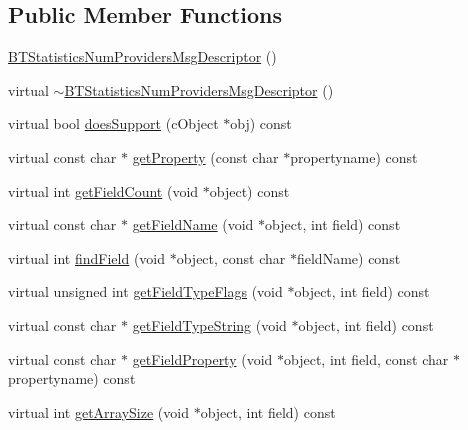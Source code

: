 \subsection*{Public Member Functions}
\begin{DoxyCompactItemize}
\item 
\hyperlink{classBTStatisticsNumProvidersMsgDescriptor_a6bceac3ad7bb634e3ee1a85156dc7524}{B\+T\+Statistics\+Num\+Providers\+Msg\+Descriptor} ()
\item 
virtual \hyperlink{classBTStatisticsNumProvidersMsgDescriptor_a0d2d1a8cbd91dc37741ecbddbb986e54}{$\sim$\+B\+T\+Statistics\+Num\+Providers\+Msg\+Descriptor} ()
\item 
virtual bool \hyperlink{classBTStatisticsNumProvidersMsgDescriptor_a4140af5b4d771f52e47d645675891a77}{does\+Support} (c\+Object $\ast$obj) const 
\item 
virtual const char $\ast$ \hyperlink{classBTStatisticsNumProvidersMsgDescriptor_ac0b00a1d046cc8e0e106abc4297c082a}{get\+Property} (const char $\ast$propertyname) const 
\item 
virtual int \hyperlink{classBTStatisticsNumProvidersMsgDescriptor_a94e59af862bad393266dab838ff3e94b}{get\+Field\+Count} (void $\ast$object) const 
\item 
virtual const char $\ast$ \hyperlink{classBTStatisticsNumProvidersMsgDescriptor_a129ffdb57624b98e377393985c5c370b}{get\+Field\+Name} (void $\ast$object, int field) const 
\item 
virtual int \hyperlink{classBTStatisticsNumProvidersMsgDescriptor_ae61c49208e0a400b707b49d3690ab8c1}{find\+Field} (void $\ast$object, const char $\ast$field\+Name) const 
\item 
virtual unsigned int \hyperlink{classBTStatisticsNumProvidersMsgDescriptor_ae8a24bd14f51c5a4e430d72f24baa7a4}{get\+Field\+Type\+Flags} (void $\ast$object, int field) const 
\item 
virtual const char $\ast$ \hyperlink{classBTStatisticsNumProvidersMsgDescriptor_aec1d5d249cfb413c8f8cca0f8ae76392}{get\+Field\+Type\+String} (void $\ast$object, int field) const 
\item 
virtual const char $\ast$ \hyperlink{classBTStatisticsNumProvidersMsgDescriptor_a137e1080f841f8df336325f458ae801c}{get\+Field\+Property} (void $\ast$object, int field, const char $\ast$propertyname) const 
\item 
virtual int \hyperlink{classBTStatisticsNumProvidersMsgDescriptor_aca292acecda6b63aff572701196c8033}{get\+Array\+Size} (void $\ast$object, int field) const 

\end{DoxyCompactItemize}
